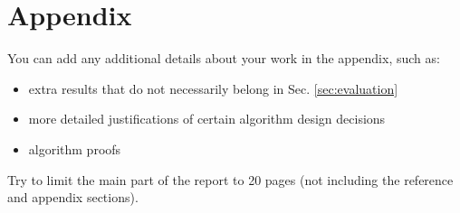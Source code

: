 \documentclass[../report.tex]{subfiles}
\begin{document}
    \section*{Appendix}
    \label{sec:appendix}

    You can add any additional details about your work in the appendix, such as:
    \begin{itemize}
        \item extra results that do not necessarily belong in Sec. \ref{sec:evaluation}
        \item more detailed justifications of certain algorithm design decisions
        \item algorithm proofs
    \end{itemize}

    Try to limit the main part of the report to 20 pages (not including the reference and appendix sections).
\end{document}
